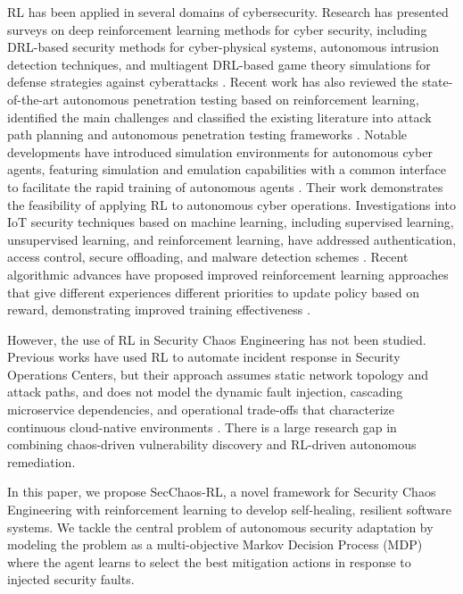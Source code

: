 \documentclass[pdflatex,sn-mathphys-num]{sn-jnl}%
\theoremstyle{thmstyleone}%
\theoremstyle{thmstyletwo}%
\theoremstyle{thmstylethree}%
\begin{document}
	RL has been applied in several domains of cybersecurity. Research has presented surveys on deep reinforcement learning methods for cyber security, including DRL-based security methods for cyber-physical systems, autonomous intrusion detection techniques, and multiagent DRL-based game theory simulations for defense strategies against cyberattacks \cite{nguyen2021deep}. Recent work has also reviewed the state-of-the-art autonomous penetration testing based on reinforcement learning, identified the main challenges and classified the existing literature into attack path planning and autonomous penetration testing frameworks \cite{liu2025autonomous}. Notable developments have introduced simulation environments for autonomous cyber agents, featuring simulation and emulation capabilities with a common interface to facilitate the rapid training of autonomous agents \cite{standen2021cyborg}. Their work demonstrates the feasibility of applying RL to autonomous cyber operations. Investigations into IoT security techniques based on machine learning, including supervised learning, unsupervised learning, and reinforcement learning, have addressed authentication, access control, secure offloading, and malware detection schemes \cite{xiao2018iot}. Recent algorithmic advances have proposed improved reinforcement learning approaches that give different experiences different priorities to update policy based on reward, demonstrating improved training effectiveness \cite{zheng2025proximal}.
	
	However, the use of RL in Security Chaos Engineering has not been studied. Previous works have used RL to automate incident response in Security Operations Centers, but their approach assumes static network topology and attack paths, and does not model the dynamic fault injection, cascading microservice dependencies, and operational trade-offs that characterize continuous cloud-native environments \cite{standen2021cyborg}. There is a large research gap in combining chaos-driven vulnerability discovery and RL-driven autonomous remediation. 
	
	In this paper, we propose SecChaos-RL, a novel framework for Security Chaos Engineering with reinforcement learning to develop self-healing, resilient software systems. We tackle the central problem of autonomous security adaptation by modeling the problem as a multi-objective Markov Decision Process (MDP) where the agent learns to select the best mitigation actions in response to injected security faults. 
	
\end{document}
